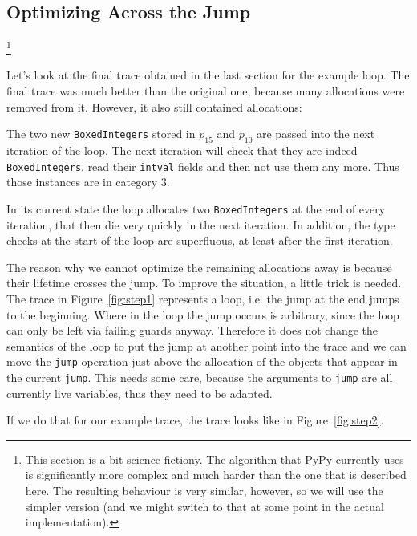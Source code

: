 \documentclass{sigplanconf}
\begin{document}

\subsection{Optimizing Across the Jump}

\footnote{This section is a bit
science-fictiony. The algorithm that PyPy currently uses is significantly more
complex and much harder than the one that is described here. The resulting
behaviour is very similar, however, so we will use the simpler version (and we
might switch to that at some point in the actual implementation).}

Let's look at the final trace obtained in the last section for the example loop.
The final trace was much better than the original one, because many allocations
were removed from it. However, it also still contained allocations:

The two new \texttt{BoxedIntegers} stored in $p_{15}$ and $p_{10}$ are passed into
the next iteration of the loop. The next iteration will check that they are
indeed \texttt{BoxedIntegers}, read their \texttt{intval} fields and then not use them
any more. Thus those instances are in category 3.

In its current state the loop
allocates two \texttt{BoxedIntegers} at the end of every iteration, that then die
very quickly in the next iteration. In addition, the type checks at the start
of the loop are superfluous, at least after the first iteration.

The reason why we cannot optimize the remaining allocations away is because
their lifetime crosses the jump. To improve the situation, a little trick is
needed. The trace in Figure~\ref{fig:step1} represents a loop, i.e. the jump at the end jumps to
the beginning. Where in the loop the jump occurs is arbitrary, since the loop
can only be left via failing guards anyway. Therefore it does not change the
semantics of the loop to put the jump at another point into the trace and we
can move the \texttt{jump} operation just above the allocation of the objects that
appear in the current \texttt{jump}. This needs some care, because the arguments to
\texttt{jump} are all currently live variables, thus they need to be adapted.

If we do that for our example trace, the trace looks like in Figure~\ref{fig:step2}.
\end{document}
